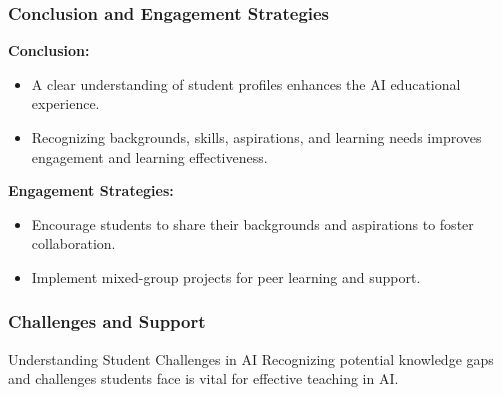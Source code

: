 \documentclass[aspectratio=169]{beamer}
\begin{document}
\begin{frame}[fragile]
    \frametitle{Conclusion and Engagement Strategies}
    \textbf{Conclusion:} 
    \begin{itemize}
        \item A clear understanding of student profiles enhances the AI educational experience.
        \item Recognizing backgrounds, skills, aspirations, and learning needs improves engagement and learning effectiveness.
    \end{itemize}

    \textbf{Engagement Strategies:}
    \begin{itemize}
        \item Encourage students to share their backgrounds and aspirations to foster collaboration.
        \item Implement mixed-group projects for peer learning and support.
    \end{itemize}
\end{frame}

\begin{frame}[fragile]
    \frametitle{Challenges and Support}
    \begin{block}{Understanding Student Challenges in AI}
        Recognizing potential knowledge gaps and challenges students face is vital for effective teaching in AI.
    \end{block}
\end{frame}
\end{document}
